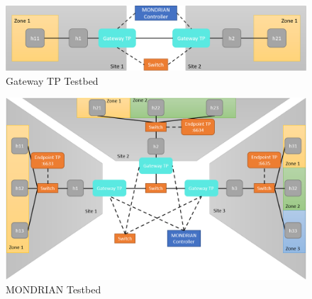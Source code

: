 \begin{figure}[h]
    \centering
    \includegraphics[width =\textwidth]{img/Gateway_TP_testbed.png}
    \caption{Gateway \acs{TP} Testbed}
    \label{Gateway TP Testbed}
\end{figure}

\begin{figure}[h]
    \centering
    \includegraphics[width =\textwidth]{img/Mondrian_testbed.png}
    \caption{MONDRIAN Testbed}
    \label{MONDRIAN Testbed}
\end{figure}